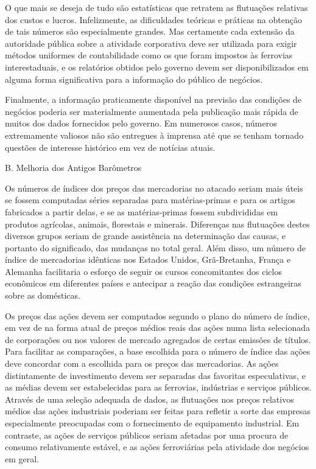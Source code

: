 \documentclass[12pt]{article}
\begin{document}
O que mais se deseja de tudo são estatísticas que retratem as flutuações relativas dos custos e lucros. Infelizmente, as dificuldades teóricas e práticas na obtenção de tais números são especialmente grandes. Mas certamente cada extensão da autoridade pública sobre a atividade corporativa deve ser utilizada para exigir métodos uniformes de contabilidade como os que foram impostos às ferrovias interestaduais, e os relatórios obtidos pelo governo devem ser disponibilizados em alguma forma significativa para a informação do público de negócios.

Finalmente, a informação praticamente disponível na previsão das condições de negócios poderia ser materialmente aumentada pela publicação mais rápida de muitos dos dados fornecidos pelo governo. Em numerosos casos, números extremamente valiosos não são entregues à imprensa até que se tenham tornado questões de interesse histórico em vez de notícias atuais.

B. Melhoria dos Antigos Barômetros

Os números de índices dos preços das mercadorias no atacado seriam mais úteis se fossem computadas séries separadas para matérias-primas e para os artigos fabricados a partir delas, e se as matérias-primas fossem subdivididas em produtos agrícolas, animais, florestais e minerais. Diferenças nas flutuações destes diversos grupos seriam de grande assistência na determinação das causas, e portanto do significado, das mudanças no total geral. Além disso, um número de índice de mercadorias idênticas nos Estados Unidos, Grã-Bretanha, França e Alemanha facilitaria o esforço de seguir os cursos concomitantes dos ciclos econômicos em diferentes países e antecipar a reação das condições estrangeiras sobre as domésticas.

Os preços das ações devem ser computados segundo o plano do número de índice, em vez de na forma atual de preços médios reais das ações numa lista selecionada de corporações ou nos valores de mercado agregados de certas emissões de títulos. Para facilitar as comparações, a base escolhida para o número de índice das ações deve concordar com a escolhida para os preços das mercadorias. As ações distintamente de investimento devem ser separadas das favoritas especulativas, e as médias devem ser estabelecidas para as ferrovias, indústrias e serviços públicos. Através de uma seleção adequada de dados, as flutuações nos preços relativos médios das ações industriais poderiam ser feitas para refletir a sorte das empresas especialmente preocupadas com o fornecimento de equipamento industrial. Em contraste, as ações de serviços públicos seriam afetadas por uma procura de consumo relativamente estável, e as ações ferroviárias pela atividade dos negócios em geral.
\end{document}
